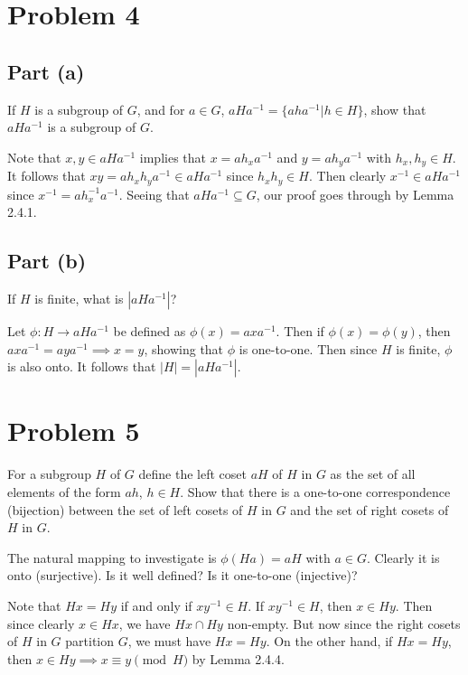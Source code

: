 \documentclass[12pt]{article}
\begin{document}
\section*{Problem 4}

\subsection*{Part (a)}

If $H$ is a subgroup of $G$, and for $a\in G$, $aHa^{-1}=\{aha^{-1}|h\in H\}$, show that $aHa^{-1}$ is a subgroup of $G$.

Note that $x,y\in aHa^{-1}$ implies that $x=ah_xa^{-1}$ and $y=ah_ya^{-1}$ with $h_x,h_y\in H$.
It follows that $xy=ah_xh_ya^{-1}\in aHa^{-1}$ since $h_xh_y\in H$.
Then clearly $x^{-1}\in aHa^{-1}$ since $x^{-1}=ah_x^{-1}a^{-1}$.
Seeing that $aHa^{-1}\subseteq G$, our proof goes through by Lemma 2.4.1.

\subsection*{Part (b)}

If $H$ is finite, what is $|aHa^{-1}|$?

Let $\phi:H\to aHa^{-1}$ be defined as $\phi(x)=axa^{-1}$.  Then if $\phi(x)=\phi(y)$, then $axa^{-1}=aya^{-1}\implies x=y$,
showing that $\phi$ is one-to-one.  Then since $H$ is finite, $\phi$ is also onto.  It follows that $|H|=|aHa^{-1}|$.

\section*{Problem 5}

For a subgroup $H$ of $G$ define the left coset $aH$ of $H$ in $G$ as the set of all elements of the form
$ah$, $h\in H$.  Show that there is a one-to-one correspondence (bijection) between the set of left cosets
of $H$ in $G$ and the set of right cosets of $H$ in $G$.

The natural mapping to investigate is $\phi(Ha)=aH$ with $a\in G$.  Clearly it is onto (surjective).  Is it well defined?  Is it one-to-one (injective)?

Note that $Hx=Hy$ if and only if $xy^{-1}\in H$.  If $xy^{-1}\in H$, then
$x\in Hy$.  Then since clearly $x\in Hx$, we have $Hx\cap Hy$ non-empty.
But now since the right cosets of $H$ in $G$ partition $G$, we must have $Hx=Hy$.
On the other hand, if $Hx=Hy$, then $x\in Hy\implies x\equiv y\pmod{H}$ by Lemma 2.4.4.
\end{document}

